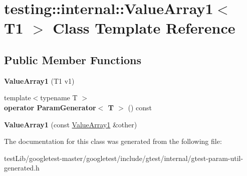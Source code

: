 \hypertarget{classtesting_1_1internal_1_1ValueArray1}{}\section{testing\+:\+:internal\+:\+:Value\+Array1$<$ T1 $>$ Class Template Reference}
\label{classtesting_1_1internal_1_1ValueArray1}
\subsection*{Public Member Functions}
\begin{DoxyCompactItemize}
\item 
\mbox{\label{classtesting_1_1internal_1_1ValueArray1_a8eaffed25a4ddbe790472ca07595a319}} 
{\bfseries Value\+Array1} (T1 v1)
\item 
\mbox{\label{classtesting_1_1internal_1_1ValueArray1_a1ffe0a28fd09efa980df1aaa3f7af2a0}} 
{\footnotesize template$<$typename T $>$ }\\{\bfseries operator Param\+Generator$<$ T $>$} () const
\item 
\mbox{\label{classtesting_1_1internal_1_1ValueArray1_a54a3968da3354334cb4d730f5254e216}} 
{\bfseries Value\+Array1} (const \hyperlink{classtesting_1_1internal_1_1ValueArray1}{Value\+Array1} \&other)
\end{DoxyCompactItemize}


The documentation for this class was generated from the following file\+:\begin{DoxyCompactItemize}
\item 
test\+Lib/googletest-\/master/googletest/include/gtest/internal/gtest-\/param-\/util-\/generated.\+h\end{DoxyCompactItemize}
